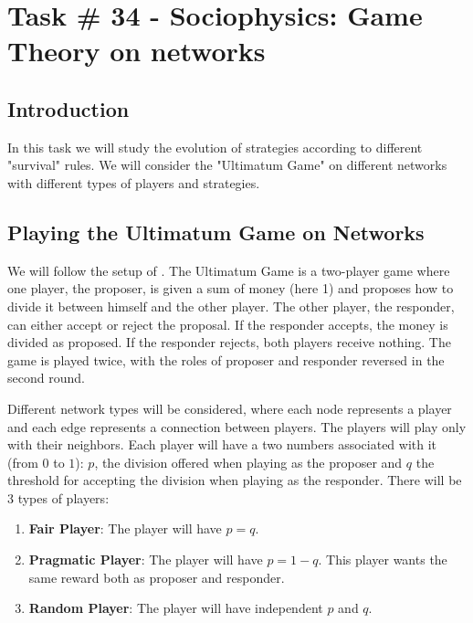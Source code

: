 \chapter{Task \# 34 - Sociophysics: Game Theory on networks}


\section{Introduction}
 
In this task we will study the evolution of strategies according to different "survival" rules. We will consider the "Ultimatum Game" on different networks with different types of players and strategies.

\section{Playing the Ultimatum Game on Networks}


We will follow the setup of \cite{UltimatumGame}. The Ultimatum Game is a two-player game where one player, the proposer, is given a sum of money (here 1) and proposes how to divide it between himself and the other player. The other player, the responder, can either accept or reject the proposal. If the responder accepts, the money is divided as proposed. If the responder rejects, both players receive nothing. The game is played twice, with the roles of proposer and responder reversed in the second round.


Different network types will be considered, where each node represents a player and each edge represents a connection between players. The players will play only with their neighbors. Each player will have a two numbers associated with it (from $0$ to $1$): $p$, the division offered when playing as the proposer and $q$ the threshold for accepting the division when playing as the responder.
There will be 3 types of players:
\begin{enumerate}[label=(\Alph*)]
    \item \textbf{Fair Player}: The player will have $p = q$.
    \item \textbf{Pragmatic Player}: The player will have $p = 1 - q$. This player wants the same reward both as proposer and responder.
    \item \textbf{Random Player}: The player will have independent $p$ and $q$.
\end{enumerate}

